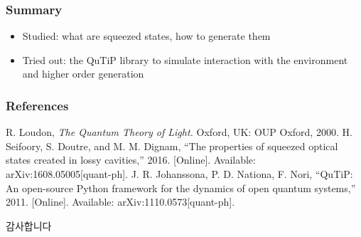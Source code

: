 \documentclass{beamer}
\begin{document}
\begin{frame}[c]
  \frametitle{Summary}
  \begin{itemize}
     \item Studied: what are squeezed states, how to generate them
     \item Tried out: the QuTiP library to simulate interaction with the environment and higher order generation
  \end{itemize}
\end{frame}

\begin{frame}[c]
\frametitle{References}
\footnotesize{
\begin{thebibliography}{99} %
 R. Loudon, \textit{The Quantum Theory of Light.} Oxford, UK: OUP Oxford, 2000.
 H. Seifoory, S. Doutre, and M. M. Dignam, ``The properties of squeezed optical states created in lossy cavities,'' 2016. [Online]. Available: arXiv:1608.05005[quant-ph].
 J. R. Johanssona, P. D. Nationa, F. Nori, ``QuTiP: An open-source Python framework for the dynamics of open quantum
systems,'' 2011. [Online]. Available: arXiv:1110.0573[quant-ph].
\end{thebibliography}
}
\end{frame}

\begin{frame}[c]
  \centering\LARGE
  감사합니다\\[\baselineskip]
\end{frame}
\end{document}
